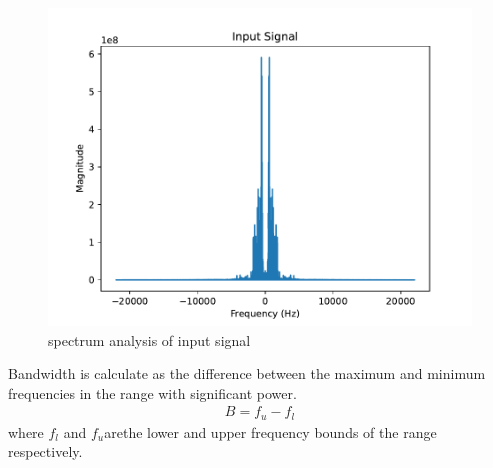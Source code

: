 \documentclass[12pt]{book}
\renewcommand\thesection{\arabic{section}}
\begin{document}
\begin{enumerate}[label=\arabic*.,ref=\thesection.\theenumi]
\begin {enumerate}
\begin{figure}
\centering 
\includegraphics[width=\columnwidth]{./inputs.pdf}
\caption{spectrum analysis of input signal}
\label{fig:input_spectrum}
\end{figure}

\end{enumerate}
 Bandwidth  is calculate as the difference between the maximum and minimum frequencies in the range with significant power.
\begin{align*}
B = f_u - f_l
\end{align*}
where $f_l $ and $f_u $arethe lower and upper frequency bounds of the range  respectively.
\
\end{enumerate}
\end{document}
